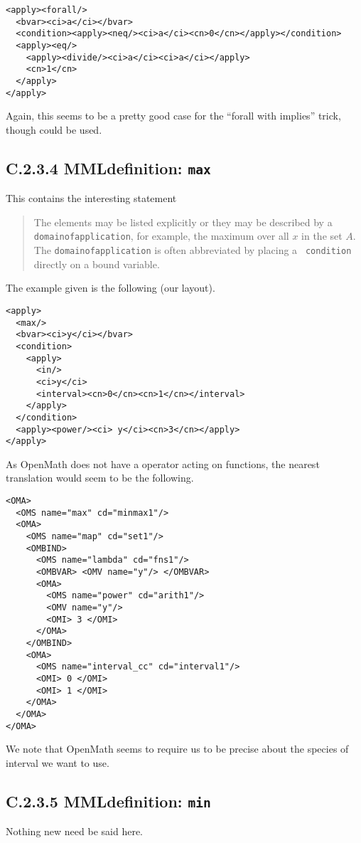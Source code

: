 \documentclass{llncs}
\begin{document}
{\begin{lstlisting}[language=MathML2]
<apply><forall/>
  <bvar><ci>a</ci></bvar>
  <condition><apply><neq/><ci>a</ci><cn>0</cn></apply></condition>
  <apply><eq/>
    <apply><divide/><ci>a</ci><ci>a</ci></apply>
    <cn>1</cn>
  </apply>
</apply>
\end{lstlisting}
Again, this seems to be a pretty good case for the ``forall with implies''
trick, though {} could be used.
\subsection{C.2.3.4 MMLdefinition: {\tt max}}\label{C234}
This contains the interesting statement
\begin{quotation}\noindent
The elements may be listed explicitly or they may be described by a {\tt
domainofapplication}, for example, the maximum over all $x$ in the set $A$.
The {\tt domainofapplication} is often abbreviated by placing a {\tt
condition} directly on a bound variable. 
\end{quotation}
The example given is the following (our layout).
\begin{lstlisting}[language=MathML2]
<apply>
  <max/>
  <bvar><ci>y</ci></bvar>
  <condition>
    <apply>
      <in/>
      <ci>y</ci>
      <interval><cn>0</cn><cn>1</cn></interval>
    </apply>
  </condition>
  <apply><power/><ci> y</ci><cn>3</cn></apply>
</apply>
\end{lstlisting}
As OpenMath does not have a {} operator acting on functions,
the nearest translation would seem to be the following.
\begin{lstlisting} 
<OMA>
  <OMS name="max" cd="minmax1"/>
  <OMA>
    <OMS name="map" cd="set1"/>
    <OMBIND>
      <OMS name="lambda" cd="fns1"/>
      <OMBVAR> <OMV name="y"/> </OMBVAR>
      <OMA>
        <OMS name="power" cd="arith1"/>
        <OMV name="y"/>
        <OMI> 3 </OMI>
      </OMA>
    </OMBIND>
    <OMA>
      <OMS name="interval_cc" cd="interval1"/>
      <OMI> 0 </OMI>
      <OMI> 1 </OMI>
    </OMA>
  </OMA>
</OMA>
\end{lstlisting}
We note that OpenMath seems to require us to be precise about the species of
interval we want to use.
\subsection{C.2.3.5 MMLdefinition: {\tt min}}\label{C235}
Nothing new need be said here.
}
\end{document}

